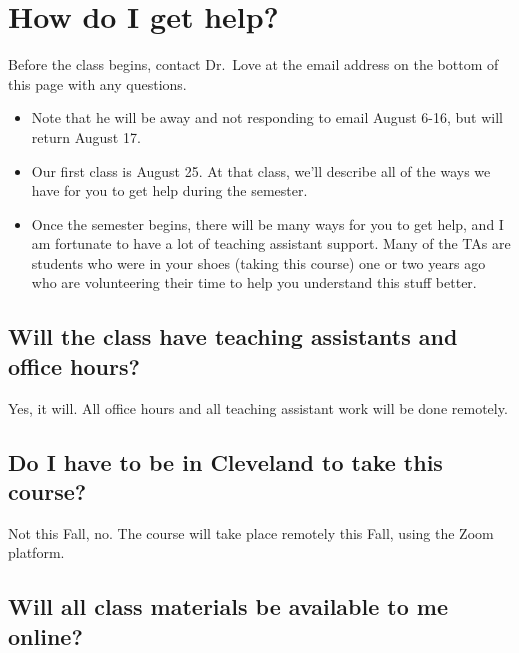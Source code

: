 \documentclass[
]{book}
\providecommand{\tightlist}{%
  \setlength{\itemsep}{0pt}\setlength{\parskip}{0pt}}
\begin{document}
\hypertarget{how-do-i-get-help}{%
\section{How do I get help?}\label{how-do-i-get-help}}

Before the class begins, contact Dr.~Love at the email address on the bottom of this page with any questions.

\begin{itemize}
\tightlist
\item
  Note that he will be away and not responding to email August 6-16, but will return August 17.
\item
  Our first class is August 25. At that class, we'll describe all of the ways we have for you to get help during the semester.
\item
  Once the semester begins, there will be many ways for you to get help, and I am fortunate to have a lot of teaching assistant support. Many of the TAs are students who were in your shoes (taking this course) one or two years ago who are volunteering their time to help you understand this stuff better.
\end{itemize}

\hypertarget{will-the-class-have-teaching-assistants-and-office-hours}{%
\subsection{Will the class have teaching assistants and office hours?}\label{will-the-class-have-teaching-assistants-and-office-hours}}

Yes, it will. All office hours and all teaching assistant work will be done remotely.

\hypertarget{do-i-have-to-be-in-cleveland-to-take-this-course}{%
\subsection{Do I have to be in Cleveland to take this course?}\label{do-i-have-to-be-in-cleveland-to-take-this-course}}

Not this Fall, no. The course will take place remotely this Fall, using the Zoom platform.

\hypertarget{will-all-class-materials-be-available-to-me-online}{%
\subsection{Will all class materials be available to me online?}\label{will-all-class-materials-be-available-to-me-online}}
\end{document}
